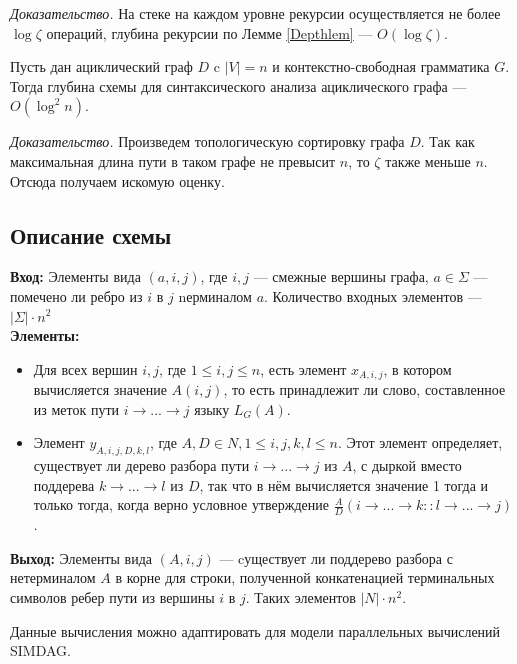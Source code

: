 \textit{Доказательство.} На стеке на каждом уровне рекурсии осуществляется не более $\log \zeta$ операций, глубина рекурсии по Лемме \ref{Depthlem} --- $O(\log \zeta)$.
\begin{corollaryrus} Пусть дан ациклический граф $D$ c $|V|=n$ и контекстно-свободная грамматика $G$. Тогда  глубина схемы для синтаксического анализа ациклического графа --- $O(\log^2 n)$.
\end{corollaryrus}
\textit{Доказательство.} Произведем топологическую сортировку графа $D$. Так как максимальная длина пути в таком графе не превысит $n$, то $\zeta$ также меньше $n$. Отсюда получаем искомую оценку.
\subsection {Описание схемы}
\textbf{Вход:} Элементы вида $(a, i, j)$, где $i, j$ --- смежные вершины графа, $a \in \Sigma$ --- помечено ли ребро из $i$ в $j$ nерминалом $a$. Количество входных элементов --- $|\Sigma| \cdot n^2$
\\
\newline\textbf{Элементы:}
\begin{itemize}
  \item Для всех вершин $i, j$, где $1 \leq i, j \leq n$, есть элемент $x_{A, i, j}$, в котором вычисляется значение $A(i, j)$, то есть принадлежит ли слово, составленное из меток пути $i \rightarrow ...  \rightarrow j$ языку $L_G(A).$
  \item Элемент $y_{A,i,j,D,k,l}$, где $A, D \in N, 1 \leq i, j, k, l \leq n $. Этот элемент определяет, существует ли дерево разбора пути $i  \rightarrow ...  \rightarrow j$ из $A$, с дыркой вместо поддерева $k \rightarrow ...  \rightarrow l$ из $D$, так что в нём вычисляется значение 1 тогда и только тогда, когда верно условное утверждение $\frac{A}{D}(i \rightarrow... \rightarrow k :: l \rightarrow... \rightarrow j )$.
\end{itemize}
\textbf{Выход:} Элементы вида $(A, i, j)$ --- cуществует ли поддерево разбора с нетерминалом $A$ в корне для строки, полученной конкатенацией терминальных символов ребер пути из вершины $i$ в $j$. Таких элементов $|N| \cdot n^2$. \par
Данные вычисления можно адаптировать для модели параллельных вычислений SIMDAG.


